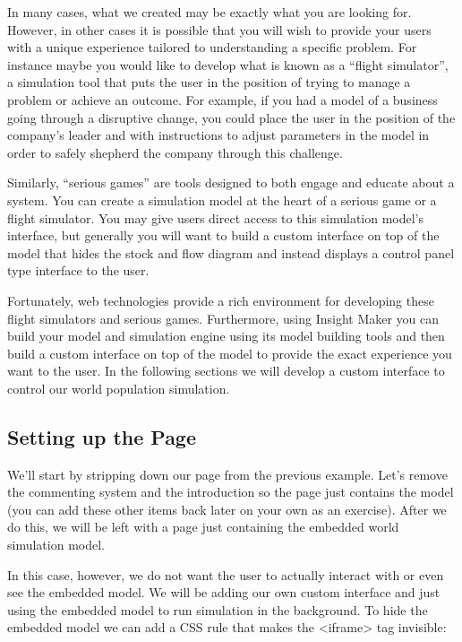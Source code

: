 \documentclass[]{memoir}
\begin{document}
In many cases, what we created may be exactly what you are looking for.
However, in other cases it is possible that you will wish to provide
your users with a unique experience tailored to understanding a specific
problem. For instance maybe you would like to develop what is known as a
``flight simulator'', a simulation tool that puts the user in the
position of trying to manage a problem or achieve an outcome. For
example, if you had a model of a business going through a disruptive
change, you could place the user in the position of the company's leader
and with instructions to adjust parameters in the model in order to
safely shepherd the company through this challenge.

Similarly, ``serious games'' are tools designed to both engage and
educate about a system. You can create a simulation model at the heart
of a serious game or a flight simulator. You may give users direct
access to this simulation model's interface, but generally you will want
to build a custom interface on top of the model that hides the stock and
flow diagram and instead displays a control panel type interface to the
user.

Fortunately, web technologies provide a rich environment for developing
these flight simulators and serious games. Furthermore, using Insight
Maker you can build your model and simulation engine using its model
building tools and then build a custom interface on top of the model to
provide the exact experience you want to the user. In the following
sections we will develop a custom interface to control our world
population simulation.

\subsection{Setting up the Page}

We'll start by stripping down our page from the previous example. Let's
remove the commenting system and the introduction so the page just
contains the model (you can add these other items back later on your own
as an exercise). After we do this, we will be left with a page just
containing the embedded world simulation model.

In this case, however, we do not want the user to actually interact with
or even see the embedded model. We will be adding our own custom
interface and just using the embedded model to run simulation in the
background. To hide the embedded model we can add a CSS rule that makes
the \textless{}iframe\textgreater{} tag invisible:
\end{document}

